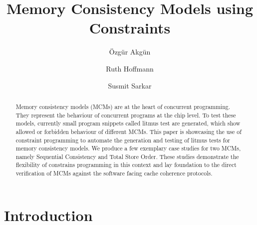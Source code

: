 \documentclass[runningheads]{llncs}
\begin{document}
\title{Memory Consistency Models using Constraints}
\author{Özgür Akgün \and Ruth Hoffmann \and Susmit Sarkar}



\maketitle

\begin{abstract}
Memory consistency models (MCMs) are at the heart of concurrent programming.
They represent the behaviour of concurrent programs at the chip level.
To test these models, currently small program snippets called litmus test are generated, which show allowed or forbidden behaviour of different MCMs.
This paper is showcasing the use of constraint programming to automate the generation and testing of litmus tests for memory consistency models.
We produce a few exemplary case studies for two MCMs, namely Sequential Consistency and Total Store Order.
These studies demonstrate the flexibility of constrains programming in this context and lay foundation to the direct verification of MCMs against the software facing cache coherence protocols.

\end{abstract}
%
%

\section{Introduction}
\end{document}
